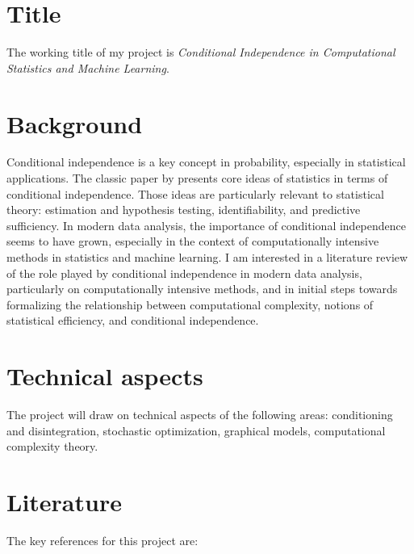 \documentclass[]{STAT_547C}
\begin{document}
\vspace{-2cm}


\section{Title}

The working title of my project is \emph{Conditional Independence in Computational Statistics and Machine Learning}.  

\section{Background}

Conditional independence is a key concept in probability, especially in statistical applications. The classic paper by \citet{Dawid:1979:CondIndStatTheory} presents core ideas of statistics in terms of conditional independence. Those ideas are particularly relevant to statistical theory: estimation and hypothesis testing, identifiability, and predictive sufficiency. In modern data analysis, the importance of conditional independence seems to have grown, especially in the context of computationally intensive methods in statistics and machine learning. I am interested in a literature review of the role played by conditional independence in modern data analysis, particularly on computationally intensive methods, and in initial steps towards formalizing the relationship between computational complexity, notions of statistical efficiency, and conditional independence.

\section{Technical aspects}

The project will draw on technical aspects of the following areas: conditioning and disintegration, stochastic optimization, graphical models, computational complexity theory.


\section{Literature}

The key references for this project are:
\end{document}
